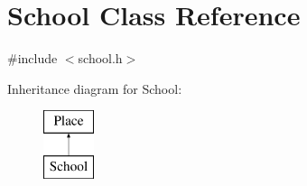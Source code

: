 \hypertarget{classSchool}{}\section{School Class Reference}
\label{classSchool}


{\ttfamily \#include $<$school.\+h$>$}

Inheritance diagram for School\+:\begin{figure}[H]
\begin{center}
\leavevmode
\includegraphics[height=2.000000cm]{classSchool}
\end{center}
\end{figure}
